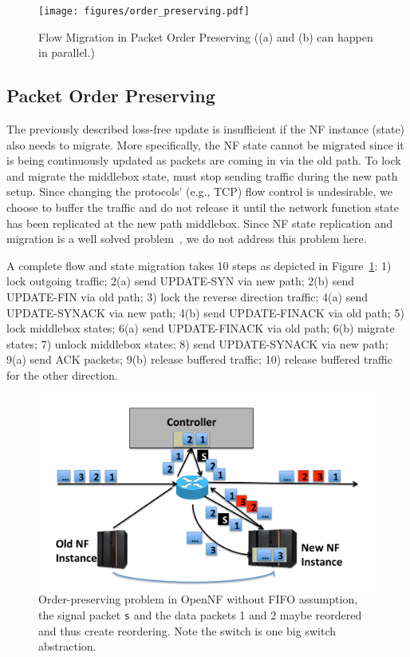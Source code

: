  \begin{figure}[ht]
\centering
\texttt{[image: figures/order\_preserving.pdf]} 

\caption{Flow Migration in Packet Order Preserving ((a) and (b) can happen in parallel.)} \label{orderpreserving} 
\end{figure}
 
\subsection{Packet Order Preserving} \label{FIFO}
The previously described loss-free update is insufficient if the NF instance (state) also needs to migrate. More specifically, the NF state cannot be migrated since it is being continuously updated as packets are coming in via the old path. To lock and migrate the middlebox state, \system must stop sending traffic during the new path setup. Since changing the protocols' (e.g., TCP) flow control is undesirable, we choose to buffer the traffic and do not release it until the network function state has been replicated at the new path middlebox. Since NF state replication and migration is a well solved problem~\cite{OpenNF, splitmerge, HAMbox}, we do not address this problem here. 

A complete flow and state migration takes 10 steps as depicted in Figure~\ref{orderpreserving}: 
1) lock outgoing traffic; 
2(a) send UPDATE-SYN via new path; 
2(b) send UPDATE-FIN via old path;
3) lock the reverse direction traffic;
4(a) send UPDATE-SYNACK via new path;
4(b) send UPDATE-FINACK via old path;
5) lock middlebox states;
6(a) send UPDATE-FINACK via old path;
6(b) migrate states;
7) unlock middlebox states;
8) send UPDATE-SYNACK via new path;
9(a) send ACK packets;
9(b) release buffered traffic;
10) release buffered traffic for the other direction.
\newline {}


\begin{figure}[ht]
\centering
\includegraphics[width=\linewidth]{figures/opennfbroke.pdf} 
\caption{\small Order-preserving problem in OpenNF without FIFO assumption, the signal packet \texttt{s} and the data packets 1 and 2 maybe reordered and thus create reordering. Note the switch is one big switch abstraction.}\label{opennfbroke}
\end{figure}


